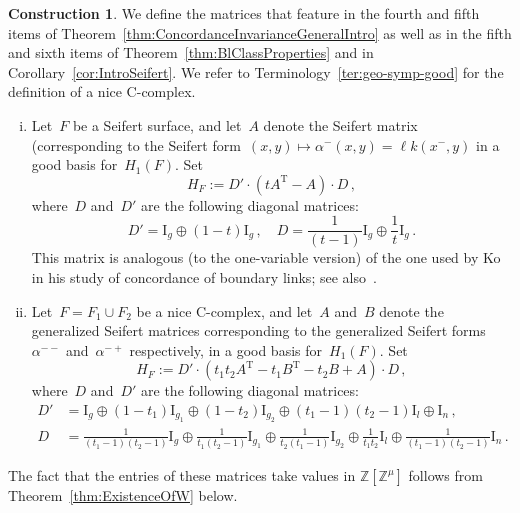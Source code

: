 \documentclass[10.9pt,a4paper]{amsart}
\theoremstyle{definition}
\newtheorem{construction}[theorem]{Construction}
\theoremstyle{remark}
\newcommand{\Z}{\mathbb{Z}}
\newcommand{\lk}{\ell k}
\newcommand{\T}{{\operatorname{T}}}
\begin{document}
\begin{construction}
\label{cons:MatrixH}
We define the matrices that feature in the fourth and fifth items of Theorem~\ref{thm:ConcordanceInvarianceGeneralIntro} as well as in the fifth and sixth items of Theorem~\ref{thm:BlClassProperties} and in Corollary~\ref{cor:IntroSeifert}.
We refer to Terminology~\ref{ter:geo-symp-good} for the definition of a nice C-complex.
\begin{enumerate}[(i)]
\item Let~$F$ be a Seifert surface, and let~$A$ denote the Seifert matrix (corresponding to the Seifert
form~$(x,y)\mapsto\alpha^-(x,y)=\lk(x^-,y)$ in a good basis for~$H_1(F)$. Set
\[
H_{F}:=D'\cdot(tA^{\T}-A)\cdot D\,,
\]
where~$D$ and~$D'$ are the following diagonal matrices:
\[
D'=\mathrm{I}_{g}\oplus(1-t)\mathrm{I}_{g}\,,\quad
D=\frac{1}{(t-1)}\mathrm{I}_{g}\oplus \frac{1}{t}\mathrm{I}_{g}\,.
\]
This matrix is analogous (to the one-variable version) of the one used by Ko~\cite[Section~4]{Ko2} in his study of concordance of boundary links; see also~\cite[Equation (2.3)]{BorodzikFriedl}.
\item Let~$F=F_1\cup F_2$ be a nice C-complex, and let~$A$ and~$B$ denote the generalized Seifert matrices corresponding to the generalized Seifert forms~$\alpha^{--}$ and~$\alpha^{-+}$ respectively, in a good basis for~$H_1(F)$. Set
\[
H_{F} := D' \cdot (t_1 t_2 A^{\T} - t_1 B^{\T} - t_2 B + A) \cdot D\,,
\]
where~$D$ and~$D'$ are the following diagonal matrices:
\small
\begin{align*}
D'&=\mathrm{I}_{g}\oplus(1-t_1)\mathrm{I}_{g_1}\oplus(1-t_2)\mathrm{I}_{g_2}\oplus(t_1-1)(t_2-1)\mathrm{I}_l\oplus\mathrm{I}_{n}\,,\\
D&=\frac{1}{(t_1-1)(t_2-1)} \mathrm{I}_{g}\oplus \frac{1}{t_1(t_2-1)}\mathrm{I}_{g_1}\oplus \frac{1}{t_2(t_1-1)}\mathrm{I}_{g_2}\oplus \frac{1}{t_1t_2}\mathrm{I}_l\oplus\frac{1}{(t_1-1)(t_2-1)}\mathrm{I}_{n}\,.
\end{align*}
\end{enumerate}
The fact that the entries of these matrices take values in $\Z[\Z^\mu]$ follows from Theorem~\ref{thm:ExistenceOfW} below.
\end{construction}
\end{document}
